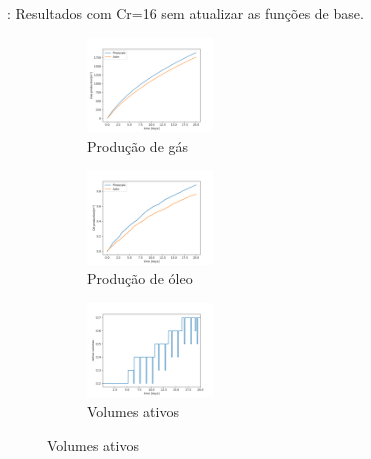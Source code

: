 \documentclass[professionalfont]{beamer}
\begin{document}
\begin{frame}{\FrameProblemName: {\small Resultados com Cr=16 sem atualizar as funções de base.}}
    \begin{figure}[!ht]
        \centering
        \begin{subfigure}{.48\textwidth}
            \centering
            \includegraphics[height=2.5cm]{./imgs/pr3/cr16/no_update/gas_prod.png}
            \caption{Produção de gás}
        \end{subfigure}
        \hfill
        \begin{subfigure}{.48\textwidth}
            \centering
            \includegraphics[height=2.5cm]{./imgs/pr3/cr16/no_update/oil_prod.png}
            \caption{Produção de óleo}
        \end{subfigure}
        \bigskip
        \begin{subfigure}{\textwidth}
            \centering
            \includegraphics[height=2.5cm]{./imgs/pr3/cr16/no_update/volumes_ativos.png}
            \caption{Volumes ativos}
        \end{subfigure}
        \label{fig:fig4_pr3-cr16}
        
    \end{figure}
    
\end{frame}
\end{document}

